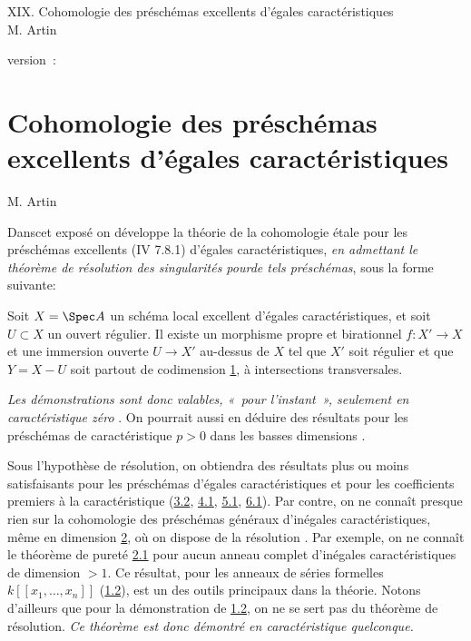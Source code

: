 \documentclass[10pt]{../fichiers-configuration-latex/smfart}
\begin{document}
\begin{center}
XIX. Cohomologie des préschémas excellents d'égales caractéristiques\\
M. Artin 
\end{center}

version : \showgitstatus{}
\tableofcontents

\else
\chapter{Cohomologie des préschémas excellents d'égales caractéristiques}
\begin{center}
M. Artin 
\end{center}
\fi

\newcommand{\UU}{\mathbf{U}}

Dans\pageoriginale cet exposé on développe la théorie de la
cohomologie étale pour 
les préschémas excellents (\EGA IV 7.8.1) d'égales caractéristiques,
\emph{en admettant le théorème de résolution des singularités
  pour\pageoriginale de tels préschémas}, sous la forme suivante:

Soit $X=\Spec A$ un schéma local excellent d'égales caractéristiques,
et soit $U\subset X$ un ouvert régulier. Il existe un morphisme propre
et birationnel $f:X'\rightarrow X$ et une immersion ouverte
$U\rightarrow X'$ au-dessus de $X$ tel que $X'$ soit régulier et que
$Y=X-U$ soit partout de codimension \hyperref[XIX.sec1]{1}, 
à intersections transversales.

\emph{Les démonstrations sont donc valables, « pour l'instant »,
  seulement en caractéristique zéro} \cite{4}. On pourrait aussi en déduire
  des résultats pour les préschémas de caractéristique $p>0$ dans les
  basses dimensions \cite{1}.

Sous l'hypothèse de résolution, on obtiendra des résultats plus ou
moins satisfaisants pour les préschémas d'égales caractéristiques et
pour les coefficients premiers à la caractéristique (\cf \hyperref[XIX.thm3.2]{3.2}, \hyperref[XIX.thm4.1]{4.1},
\hyperref[XIX.thm5.1]{5.1}, \hyperref[XIX.thm6.1]{6.1}). Par contre, on ne connaît presque rien sur la cohomologie
des préschémas généraux d'inégales caractéristiques, même en dimension
\hyperref[XIX.sec2]{2}, où on dispose de la résolution \cite{2}. Par exemple, on ne connaît le
théorème de pureté \hyperref[XIX.thm2.1]{2.1} pour aucun anneau complet d'inégales
caractéristiques de dimension $>1$. Ce résultat, pour les anneaux de
séries formelles $k[[x_{1},\ldots, x_{n}]]$ (\hyperref[XIX.thm1.2]{1.2}), est un des outils
principaux dans la théorie. Notons d'ailleurs que pour la
démonstration de \hyperref[XIX.thm1.2]{1.2}, on ne se sert pas du théorème de
résolution. \emph{Ce théorème est donc démontré en caractéristique
  quelconque.}
\end{document}
